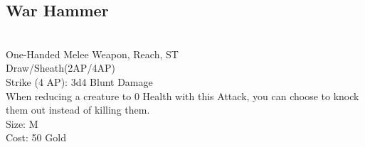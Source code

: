 \subsection{War Hammer}\label{weapon:warHammer}\\
One-Handed Melee Weapon,  Reach, ST\\
Draw/Sheath(2AP/4AP)\\
Strike (4 AP): 3d4 Blunt Damage\\
When reducing a creature to 0 Health with this Attack, you can choose to knock them out instead of killing them.\\
Size: M\\
Cost: 50 Gold\\